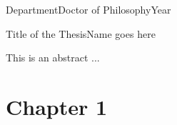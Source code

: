 \documentclass[reqno,12pt,oneside]{report}
\theoremstyle{plain}
\theoremstyle{definition}
\theoremstyle{remark}
\numberwithin{theorem}{chapter}
\begin{document}
   

{Department}{Doctor of Philosophy}{Year}


\startabstractpage
{Title of the Thesis}{Name goes here}

\label{Abstract}
This is an abstract ...


\initializefrontsections

\makeatletter
\if@twoside \setcounter{page}{4} \else \setcounter{page}{4} \fi
\makeatother


\startacknowledgementspage

\label{Acknowledgements}

\tableofcontents     

\renewcommand\cfttabaftersnum{:}
\renewcommand\cfttabpresnum{Table~}

\makeatletter
\begingroup
  \let\newcounter\@gobble
  \let\setcounter\@gobbletwo
  \globaldefs\@ne
  \let\c@loadepth\@ne
\endgroup
\let\l@algorithm\l@algorithms
\makeatother

\renewcommand\cftalgorithmsaftersnum{}
\renewcommand\cftalgorithmspresnum{Algorithm~}

\listoftables     

\newlength\myfiglength
\renewcommand\cftfigpresnum{\figurename~}
\renewcommand\cftfigaftersnum{:}
\settowidth\myfiglength{\cftfigpresnum\cftfigaftersnum}
\addtolength\cftfignumwidth{\myfiglength}
\setlength{\cftfigindent}{0in}

\listoffigures      


\startthechapters 

 \chapter{Chapter 1}
 \label{chap:Intro}
 
\end{document}
